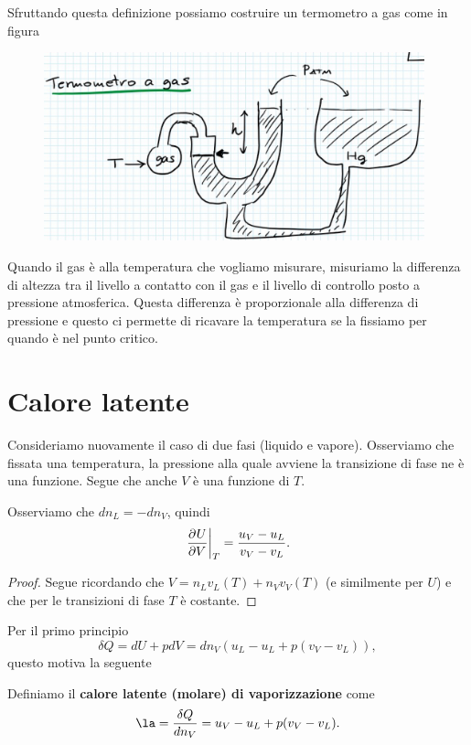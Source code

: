 \noindent Sfruttando questa definizione possiamo costruire un termometro a gas come in figura

\begin{figure}[!htb]
    \centering
    \includegraphics[width=11cm]{images/Termometro_a_gas.png}
\end{figure}


\noindent Quando il gas \`e alla temperatura che vogliamo misurare, misuriamo la differenza di altezza tra il livello a contatto con il gas e il livello di controllo posto a pressione atmosferica. 
Questa differenza \`e proporzionale alla differenza di pressione e questo ci permette di ricavare la temperatura se la fissiamo per quando \`e nel punto critico.




\section{Calore latente}
Consideriamo nuovamente il caso di due fasi (liquido e vapore). Osserviamo che fissata una temperatura, la pressione alla quale avviene la transizione di fase ne \`e una funzione. Segue che anche $V$ \`e una funzione di $T$.
\begin{remark}
Osserviamo che $dn_L=-dn_V$, quindi
\[\ppb VUT=\frac{u_V-u_L}{v_V-v_L}.\]
\end{remark}
\begin{proof}
Segue ricordando che $V=n_L v_L(T)+n_Vv_V(T)$ (e similmente per $U$) e che per le transizioni di fase $T$ \`e costante.
\end{proof}

\noindent
Per il primo principio
\[\delta Q=dU+pdV=dn_V(u_L-u_L+p(v_V-v_L)),\]
questo motiva la seguente
\begin{definition}
Definiamo il \textbf{calore latente (molare) di vaporizzazione} come
\[\la=\frac{\delta Q}{dn_V}=u_V-u_L+p(v_V-v_L).\]
\end{definition}

